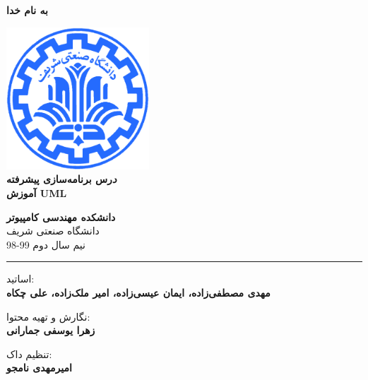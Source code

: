 \documentclass[]{article}
\begin{document}
\begin{titlepage}
\begin{center}

\textbf{ \Huge{به نام خدا} }
        
\vspace{0.2cm}

\includegraphics[width=0.4\textwidth]{sharif1.png}\\
\vspace{0.2cm}
\textbf{ \Huge{\emph درس برنامه‌سازی پیشرفته} }\\
\vspace{0.25cm}
\textbf{ \Large{آموزش UML} }
\vspace{0.2cm}
       
 
      \large \textbf{دانشکده مهندسی کامپیوتر}\\\vspace{0.1cm}
    \large   دانشگاه صنعتی شریف\\\vspace{0.2cm}
       \large   ﻧﯿﻢ سال دوم 99-98 \\\vspace{0.10cm}
      \noindent\rule[1ex]{\linewidth}{1pt}
اساتید:\\
    \textbf{{مهدی مصطفی‌زاده، ایمان عیسی‌زاده، امیر ملک‌زاده، علی چکاه}}



   

        \vspace{0.10cm}
نگارش و تهیه محتوا:\\
    \textbf{{زهرا یوسفی جمارانی}}
    

       \vspace{0.10cm}
       تنظیم داک:\\
    \textbf{{امیرمهدی نامجو}}
    
        \vspace{0.05cm}

\end{center}
\end{titlepage}
\end{document}
